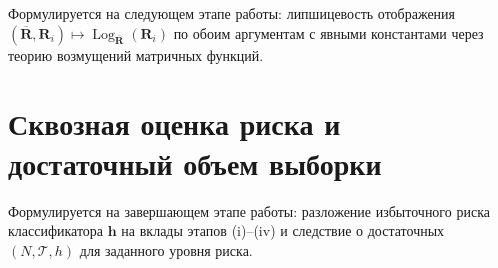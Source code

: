 \documentclass[12pt]{article}
\theoremstyle{plain}
\theoremstyle{definition}
\begin{document}
Формулируется на следующем этапе работы: липшицевость отображения $(\overline{\mathbf{R}}, \mathbf{R}_i) \mapsto \operatorname{Log}_{\overline{\mathbf{R}}}(\mathbf{R}_i)$ по обоим аргументам с явными константами через теорию возмущений матричных функций.

\section{Сквозная оценка риска и достаточный объем выборки}

Формулируется на завершающем этапе работы: разложение избыточного риска классификатора $\mathbf{h}$ на вклады этапов (i)--(iv) и следствие о достаточных $(N, \mathcal{T}, h)$ для заданного уровня риска.
\end{document}
